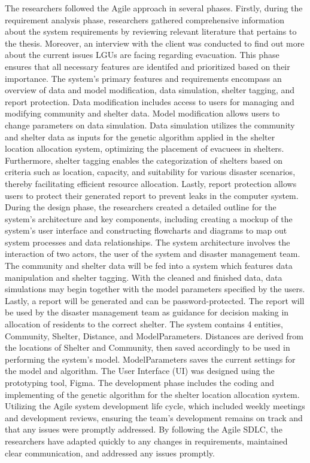 \documentclass[12pt,a4paper,]{article}
\begin{document}
	The researchers followed the Agile approach in several phases. Firstly, during the requirement analysis phase, researchers gathered comprehensive information about the system requirements by reviewing relevant literature that pertains to the thesis. Moreover, an interview with the client was conducted to find out more about the current issues LGUs are facing regarding evacuation. This phase ensures that all necessary features are identifed and prioritized based on their importance.
	The system's primary features and requirements encompass an overview of data and model modification, data simulation, shelter tagging, and report protection. Data modification includes access to users for managing and modifying community and shelter data. Model modification allows users to change parameters on data simulation. Data simulation utilizes the community and shelter data as inputs for the genetic algorithm applied in the shelter location allocation system, optimizing the placement of evacuees in shelters. Furthermore, shelter tagging enables the categorization of shelters based on criteria such as location, capacity, and suitability for various disaster scenarios, thereby facilitating efficient resource allocation. Lastly, report protection allows users to protect their generated report to prevent leaks in the computer system. During the design phase, the researchers created a detailed outline for the system’s architecture and key components, including creating a mockup of the system’s user interface and constructing flowcharts and diagrams to map out system processes and data relationships.
	The system architecture involves the interaction of two actors, the user of the system and disaster management team. The community and shelter data will be fed into a system which features data manipulation and shelter tagging. With the cleaned and finished data, data simulations may begin together with the model parameters specified by the users. Lastly, a report will be generated and can be password-protected. The report will be used by the disaster management team as guidance for decision making in allocation of residents to the correct shelter.
	The system contains 4 entities, Community, Shelter, Distance, and ModelParameters. Distances are derived from the locations of Shelter and Community, then saved accordingly to be used in performing the system’s model. ModelParameters saves the current settings for the model and algorithm.
	The User Interface (UI) was designed using the prototyping tool, Figma.
	The development phase includes the coding and implementing of the genetic algorithm for the shelter location allocation system. Utilizing the Agile system development life cycle, which included weekly meetings and development reviews, ensuring the team’s development remains on track and that any issues were promptly addressed. By following the Agile SDLC, the researchers have adapted quickly to any changes in requirements, maintained clear communication, and addressed any issues promptly.
\end{document}
